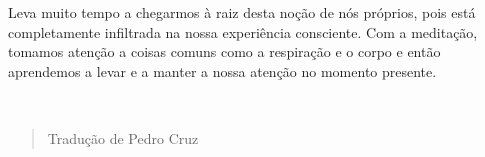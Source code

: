 Leva muito tempo a chegarmos à raiz desta noção de nós próprios, pois
está completamente infiltrada na nossa experiência consciente. Com a
meditação, tomamos atenção a coisas comuns como a respiração e o corpo e
então aprendemos a levar e a manter a nossa atenção no momento presente.

~

\begin{quote}
Tradução de Pedro Cruz
\end{quote}
